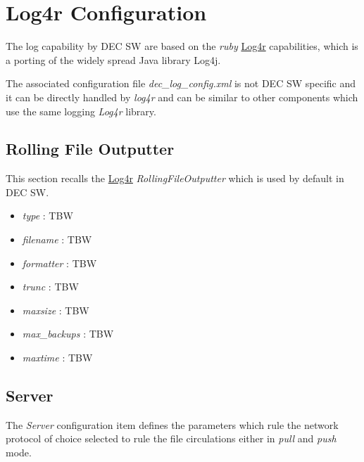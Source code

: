 \documentclass[dec_sum_main.tex]{subfiles}
\begin{document}
\section{Log4r Configuration}
 
The log capability by DEC SW are based on the \textit{ruby} \href{http://log4r.sourceforge.net/rdoc/files/log4r/configurator_rb.html}{Log4r} capabilities, which is a porting of the widely spread Java library Log4j. \newline
\par
\noindent
The associated configuration file \textit{dec\_log\_config.xml} is not DEC SW specific and it can be directly handled by \textit{log4r} and can be similar to other components which use the same logging \textit{Log4r} library.

\subsection{Rolling File Outputter}
This section recalls the \href{http://log4r.sourceforge.net/rdoc/files/log4r/configurator_rb.html}{Log4r} \textit{RollingFileOutputter} which is used by default in DEC SW.
\par
\noindent
\begin{itemize}
	\item \textit{type} : TBW
	\item \textit{filename} : TBW
	\item \textit{formatter} : TBW
	\item \textit{trunc} : TBW
	\item \textit{maxsize} : TBW
	\item \textit{max\_backups} : TBW
	\item \textit{maxtime} : TBW 
\end{itemize}

\subsection{Server}
The \textit{Server} configuration item defines the parameters which rule the network protocol of choice selected to rule the file circulations either in \textit{pull} and \textit{push} mode.

\pagebreak
\end{document}
